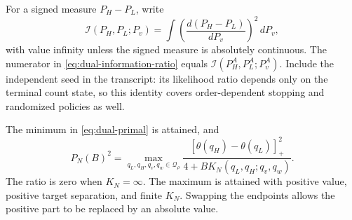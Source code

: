 For a signed measure $P_H-P_L$, write
\[
 \mathcal I(P_H,P_L;P_v)
 =\int\left(\frac{d(P_H-P_L)}{dP_v}\right)^2\,dP_v,
\]
with value infinity unless the signed measure is absolutely continuous.
The numerator in \eqref{eq:dual-information-ratio} equals
$\mathcal I(P_H^A,P_L^A;P_v^A)$. Include the independent seed in the
transcript: its likelihood ratio depends only on the terminal count
state, so this identity covers order-dependent stopping and randomized
policies as well.

\begin{theorem}\label{thm:exact-dual}
The minimum in \eqref{eq:dual-primal} is attained, and
\begin{equation}
 \boxed{
 P_N(B)^2=
 \max_{q_L,q_H,q_v,q_w\in\mathcal Q_\rho}
 \frac{[\theta(q_H)-\theta(q_L)]_+^2}
      {4+B K_N(q_L,q_H;q_v,q_w)}.}
 \label{eq:exact-four-prior-dual}
\end{equation}
The ratio is zero when $K_N=\infty$. The maximum is attained with positive
value, positive target separation, and finite $K_N$. Swapping the endpoints
allows the positive part to be replaced by an absolute value.
\end{theorem}

